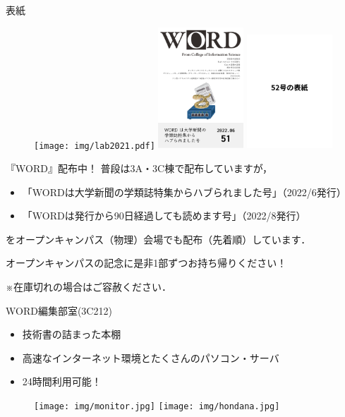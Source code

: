\documentclass[platex]{beamer}
\begin{document}
\begin{frame}[plain]{表紙}
 \begin{figure}
  \centering
  \texttt{[image: img/lab2021.pdf]}
  \includegraphics[width=32mm]{img/word51.pdf}
  \includegraphics[width=32mm]{img/word52.pdf}
 \end{figure}
\end{frame}
\begin{frame}[plain]{『WORD』配布中！}
 普段は3A・3C棟で配布していますが，
\begin{itemize}
 \item 「WORDは大学新聞の学類誌特集からハブられました号」（2022/6発行）
 \item 「WORDは発行から90日経過しても読めます号」（2022/8発行）
\end{itemize}
を\alert{オープンキャンパス（物理）会場でも配布}（先着順）しています．

オープンキャンパスの記念に是非1部ずつお持ち帰りください！

※在庫切れの場合はご容赦ください．
\end{frame}
\begin{frame}[plain]{WORD編集部室(3C212)}
 \begin{itemize}
  \item 技術書の詰まった本棚
  \item 高速なインターネット環境とたくさんのパソコン・サーバ
  \item 24時間利用可能！
 \end{itemize}
\begin{figure}
 \centering
 \texttt{[image: img/monitor.jpg]}
 \texttt{[image: img/hondana.jpg]}
\end{figure}
\end{frame}
\end{document}
